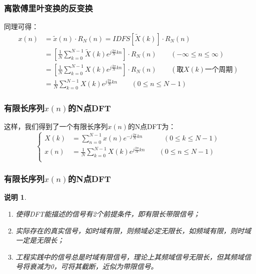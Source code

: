 \documentclass[notheorems,compress,mathserif,table]{beamer}
\newtheorem{shuoming}{说明}
\begin{document}
\begin{frame}[shrink]\frametitle{离散傅里叶变换的反变换}%
    同理可得：
    \begin{equation*}
    \begin{split}
    x(n) &= \tilde{x}(n)\cdot R_N(n) =  IDFS[\tilde{X}(k)]\cdot R_N(n)\\
          &= \left[ \frac{1}{N}\sum_{k=0}^{N-1} \tilde{X}(k)e^{j\frac{2\pi}{N}kn}\right]\cdot R_N(n)  \quad\quad (-\infty \leq n \leq \infty)\\
          &= \left[ \frac{1}{N}\sum_{k=0}^{N-1}X(k)e^{j\frac{2\pi}{N}kn}\right]\cdot R_N(n)  \quad\quad  (\mbox{取$X(k)$一个周期})\\
          &=  \frac{1}{N}\sum_{k=0}^{N-1}X(k)e^{j\frac{2\pi}{N}kn}   \quad\quad (0 \leq n \leq N-1)
    \end{split}
    \end{equation*}
\end{frame}

\begin{frame}[shrink]\frametitle{有限长序列$x(n)$的N点DFT}%
    这样，我们得到了一个有限长序列$x(n)$的N点DFT为：
    \begin{equation*}
           \left\{ \begin{aligned}
               X(k) &=  \sum_{n=0}^{N-1}x(n)e^{-j\frac{2\pi}{N}kn}  \quad\quad\quad (0 \leq k \leq N-1) \\
               x(n) &=   \frac{1}{N}\sum_{k=0}^{N-1}X(k)e^{j\frac{2\pi}{N}kn} \quad\quad (0 \leq n \leq N-1)\\
           \end{aligned} \right.
    \end{equation*}
\end{frame}    
    
    
\begin{frame}[shrink]\frametitle{有限长序列$x(n)$的N点DFT}%
\begin{shuoming}
    \begin{enumerate}
      \item 使得DFT能描述的信号有2个前提条件，即有限长带限信号；
      \item 实际存在的真实信号，如时域有限，则频域必定无限长，如频域有限，则时域一定是无限长；
      \item 工程实践中的信号总是时域有限信号，理论上其频域信号无限长，但其频域信号将衰减为0，可将其截断，近似为带限信号。
    \end{enumerate}
\end{shuoming}
\end{frame}
\end{document}
